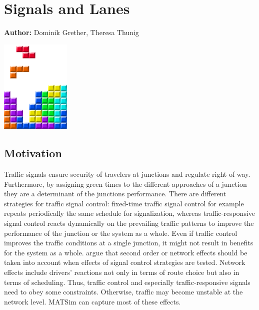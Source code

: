 \chapter{Signals and Lanes }
\label{ch:signalslanes}

\hfill \textbf{Author:} Dominik Grether, Theresa Thunig

\begin{center} \includegraphics[width=0.25\textwidth, angle=0]{figures/MATSimBook.png} \end{center}


\section{Motivation}

Traffic signals ensure security of travelers at junctions and regulate right of way. 
Furthermore, by assigning green times to the different approaches of a junction they are a determinant of the junctions performance. 
There are different strategies for traffic signal control: fixed-time traffic signal control for example repeats periodically the same schedule for signalization, whereas traffic-responsive signal control reacts dynamically on the prevailing traffic patterns to improve the performance of the junction or the system as a whole.   
Even if traffic %
control improves the traffic conditions at a single junction, it might not result in benefits for the system as a whole. 
\citet{Hu1997D2DFlowEvolutionReactiveSignalsDynasmart} argue that
second order or network effects should be taken into account when effects of signal control strategies are tested. Network effects include drivers' reactions not only in terms of route choice but also in terms of scheduling. 
Thus, traffic control and especially traffic-responsive signals need to obey some constraints. Otherwise, traffic may become unstable at the network level. 
MATSim can capture most of these effects. 

